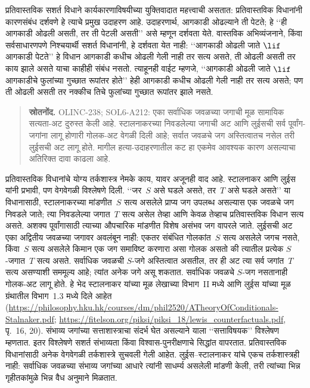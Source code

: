 प्रतिवास्तविक सशर्त विधाने
कार्यकारणाविषयीच्या
युक्तिवादात महत्त्वाची
असतात: प्रतिवास्तविक
विधानांनी कारणसंबंध
दर्शवणे हे त्याचे
प्रमुख उदाहरण आहे.
उदाहरणार्थ, आगकाडी
ओढल्याने ती पेटते;
हे ‘‘ही आगकाडी
ओढली असती, तर ती
पेटली असती’’ असे
म्हणून दर्शवता येते.
वास्तविक अभिव्यंजनाने,
किंवा सर्वसाधारणपणे
निश्चयार्थी सशर्त विधानांनी,
हे दर्शवता येत नाही:
‘‘आगकाडी ओढली जाते
$\lif$ आगकाडी पेटते’’
हे विधान आगकाडी
कधीच ओढली गेली
नाही तर सत्य असते,
ती ओढली असती
तर काय झाले असते
याचा काहीही संबंध
नसतो. त्याहूनही
वाईट म्हणजे,
‘‘आगकाडी ओढली जाते
$\lif$ आगकाडीचे
फुलांच्या गुच्छात
रूपांतर होते’’ हेही
आगकाडी कधीच
ओढली गेली नाही
तर सत्य असते;
पण ती ओढली
असती तर नक्कीच
तिचे फुलांच्या
गुच्छात रूपांतर
झाले नसते.

\begin{quote}\small\textbf{स्रोतनोंद.} OLINC-238; SOL6-A212: एका सर्वाधिक जवळच्या जगाची मूळ सामायिक सत्यता-अट दुरुस्त केली आहे. स्टालनाकरच्या निवडलेल्या जगाची अट आणि लुईसची सर्व पूर्वांग-जगांना लागू होणारी गोलक-अट वेगळी दिली आहे; सर्वात जवळचे जग अस्तित्वातच नसेल तरी लुईसची अट लागू होते. मागील हत्या-उदाहरणातील कट हा एकमेव आवश्यक कारण असल्याचा अतिरिक्त दावा काढला आहे.\end{quote}
प्रतिवास्तविक विधानांचे योग्य तर्कशास्त्र नेमके काय,
यावर अजूनही वाद आहे. स्टालनाकर आणि लुईस यांनी
प्रभावी, पण वेगवेगळी विश्लेषणे दिली.
‘‘जर~$S$ असे घडले असते, तर~$T$ असे घडले असते’’
या विधानासाठी, स्टालनाकरच्या मांडणीत~$S$ सत्य
असलेले प्राप्य जग उपलब्ध असल्यास एक जवळचे जग
निवडले जाते; त्या निवडलेल्या जगात~$T$ सत्य असेल
तेव्हा आणि केवळ तेव्हाच प्रतिवास्तविक विधान सत्य असते.
अशक्य पूर्वांगासाठी त्याच्या औपचारिक मांडणीत
विशेष असंभव जग वापरले जाते.
लुईसची अट एका अद्वितीय जवळच्या जगावर अवलंबून नाही:
एकतर संबंधित गोलकांत~$S$ सत्य असलेले जगच नसते,
किंवा~$S$ सत्य असलेले किमान एक जग समाविष्ट करणारा
असा गोलक असतो की त्यातील प्रत्येक $S$-जगात~$T$
सत्य असते. सर्वाधिक जवळची $S$-जगे अस्तित्वात
असतील, तर ही अट त्या सर्व जगांत~$T$ सत्य असण्याशी
सममूल्य आहे; त्यांत अनेक जगे असू शकतात.
सर्वाधिक जवळचे $S$-जग नसतानाही गोलक-अट लागू होते.
हे भेद स्टालनाकर यांच्या मूळ लेखाच्या विभाग~II मध्ये
आणि लुईस यांच्या मूळ ग्रंथातील विभाग~1.3 मध्ये दिले आहेत
(\url{https://philosophy.hku.hk/courses/dm/phil2520/ATheoryOfConditionals-Stalnaker.pdf};
\url{https://fitelson.org/piksi/piksi_18/lewis_counterfactuals.pdf}, पृ.~16, 20).
संभाव्य जगांच्या
सत्ताशास्त्राचा
संदर्भ घेत असल्याने
याला ‘‘सत्ताविषयक’’
विश्लेषण म्हणतात.
इतर विश्लेषणे सशर्त
संभाव्यता किंवा
विश्वास-पुनरीक्षणाचे
सिद्धांत वापरतात.
प्रतिवास्तविक विधानांसाठी
अनेक वेगवेगळी
तर्कशास्त्रे सुचवली
गेली आहेत. लुईस--स्टालनाकर
यांचे एकच तर्कशास्त्रही
नाही: सर्वाधिक जवळच्या
संभाव्य जगांच्या आधारे
त्यांनी साधर्म्य असलेली
मांडणी केली, तरी
त्यांच्या भिन्न
गृहीतकांमुळे भिन्न
वैध अनुमाने मिळतात.



